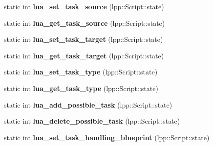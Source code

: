 \begin{DoxyCompactItemize}
\item 
static int {\bfseries lua\+\_\+set\+\_\+task\+\_\+source} (lpp\+::\+Script\+::state)\hypertarget{class_lua_interface_acc625800144a6aacf15919d26371d18c}{}\label{class_lua_interface_acc625800144a6aacf15919d26371d18c}

\item 
static int {\bfseries lua\+\_\+get\+\_\+task\+\_\+source} (lpp\+::\+Script\+::state)\hypertarget{class_lua_interface_a486a243014b793fed38a9152c48b31f1}{}\label{class_lua_interface_a486a243014b793fed38a9152c48b31f1}

\item 
static int {\bfseries lua\+\_\+set\+\_\+task\+\_\+target} (lpp\+::\+Script\+::state)\hypertarget{class_lua_interface_ad2cbfacd6e4c5a82836e410bb618e278}{}\label{class_lua_interface_ad2cbfacd6e4c5a82836e410bb618e278}

\item 
static int {\bfseries lua\+\_\+get\+\_\+task\+\_\+target} (lpp\+::\+Script\+::state)\hypertarget{class_lua_interface_a44e16a62072e54924172321c59cc2a17}{}\label{class_lua_interface_a44e16a62072e54924172321c59cc2a17}

\item 
static int {\bfseries lua\+\_\+set\+\_\+task\+\_\+type} (lpp\+::\+Script\+::state)\hypertarget{class_lua_interface_ac6c652bb845747b94dc5f63082cc1fda}{}\label{class_lua_interface_ac6c652bb845747b94dc5f63082cc1fda}

\item 
static int {\bfseries lua\+\_\+get\+\_\+task\+\_\+type} (lpp\+::\+Script\+::state)\hypertarget{class_lua_interface_a134f237e3f129ef9d264a3d9e85216a8}{}\label{class_lua_interface_a134f237e3f129ef9d264a3d9e85216a8}

\item 
static int {\bfseries lua\+\_\+add\+\_\+possible\+\_\+task} (lpp\+::\+Script\+::state)\hypertarget{class_lua_interface_ac047d11b145e549e989e2a60bcbe824b}{}\label{class_lua_interface_ac047d11b145e549e989e2a60bcbe824b}

\item 
static int {\bfseries lua\+\_\+delete\+\_\+possible\+\_\+task} (lpp\+::\+Script\+::state)\hypertarget{class_lua_interface_a6b063889179a458123434aa187d5c2d3}{}\label{class_lua_interface_a6b063889179a458123434aa187d5c2d3}

\item 
static int {\bfseries lua\+\_\+set\+\_\+task\+\_\+handling\+\_\+blueprint} (lpp\+::\+Script\+::state)\hypertarget{class_lua_interface_af2c15f7025f62c3dc048bf85cb67d424}{}\label{class_lua_interface_af2c15f7025f62c3dc048bf85cb67d424}


\end{DoxyCompactItemize}
